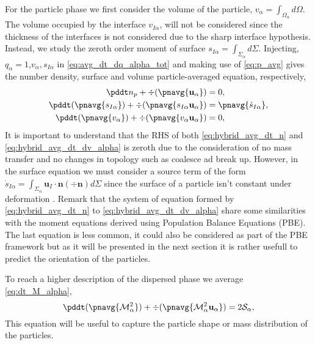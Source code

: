 For the particle phase we first consider the volume of the particle, $v_\alpha = \int_{\Omega_\alpha} d\Omega$.
The volume occupied by the interface $v_{I\alpha}$, will not be considered since the thickness of the interfaces is not considered due to the sharp interface  hypothesis.
Instead,  we study the zeroth order moment of surface $s_{I\alpha} = \int_{\Sigma_\alpha} d\Sigma$. 
Injecting, $q_\alpha = 1$,$v_\alpha, s_{I\alpha}$ in \ref{eq:avg_dt_dq_alpha_tot} and making use of \ref{eq:p_avg} gives the number density, surface and volume particle-averaged equation, respectively,
\begin{align}
    \pddt n_p
    + \div (\pnavg{\textbf{u}_\alpha})
    &= 
    0,
    \label{eq:hybrid_avg_dt_n}\\
    \pddt (\pnavg{s_{I\alpha}})
    + \div (\pnavg{s_{I\alpha}\textbf{u}_\alpha})
    &= \pnavg{\dot{s}_{I\alpha}},
    \label{eq:hybrid_avg_dt_ds_alpha}\\
    \pddt (\pnavg{v_\alpha})
    + \div (\pnavg{v_\alpha\textbf{u}_\alpha})
    &= 0,
    \label{eq:hybrid_avg_dt_dv_alpha}\\
\end{align}
It is important to understand that the RHS of both \ref{eq:hybrid_avg_dt_n} and \ref{eq:hybrid_avg_dt_dv_alpha} is zeroth due to the consideration of no mass transfer and no changes in topology such as coalesce ad break up.
However, in the surface equation we must consider a source term of the form $\dot{s}_{I\alpha} = \int_{\Sigma_\alpha} \textbf{u}_I \cdot \textbf{n}(\div \textbf{n}) d\Sigma$ since the surface of a particle isn't constant under deformation \citep{morel2007surface}. 
Remark that the system of equation formed by \ref{eq:hybrid_avg_dt_n} to \ref{eq:hybrid_avg_dt_dv_alpha} share some similarities with the moment equations derived using Population Balance Equations (PBE)\citet{KAMP20011363,marchisio2013computational}.
The last equation is less common, it could also be considered as part of the PBE framework but as it will be presented in the next section it is rather usefull to predict the orientation of the particles. 

To reach a higher description of the dispersed phase we average \ref{eq:dt_M_alpha}, 
\begin{equation*}
    \pddt (\pnavg{\mathcal{M}^2_\alpha})
    + \div (
        \pnavg{\mathcal{M}^2_\alpha\textbf{u}_\alpha}
        )
    = 2\mathcal{S}_\alpha,
    \label{eq:hybrid_avg_dt_dM_alpha}
\end{equation*}
This equation will be useful to capture the particle shape or mass distribution of the particles. 

